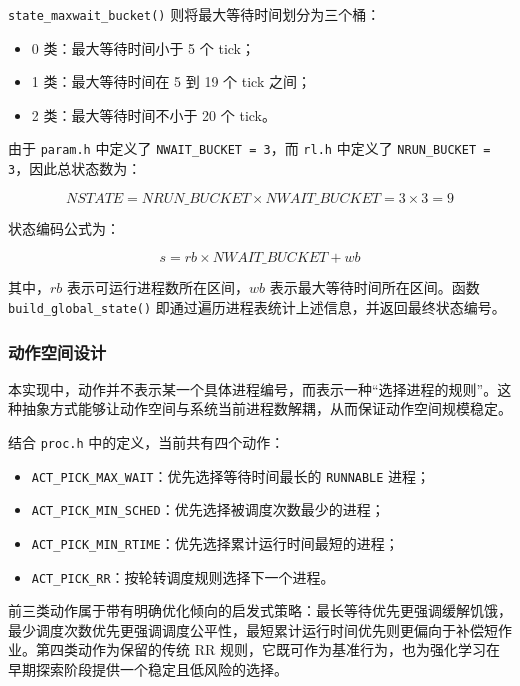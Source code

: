 \texttt{state\_maxwait\_bucket()} 则将最大等待时间划分为三个桶：

\begin{itemize}
\item 0 类：最大等待时间小于 5 个 tick；
\item 1 类：最大等待时间在 5 到 19 个 tick 之间；
\item 2 类：最大等待时间不小于 20 个 tick。
\end{itemize}

由于 \texttt{param.h} 中定义了 \texttt{NWAIT\_BUCKET = 3}，而 \texttt{rl.h} 中定义了 \texttt{NRUN\_BUCKET = 3}，因此总状态数为：

\begin{equation}
NSTATE = NRUN\_BUCKET \times NWAIT\_BUCKET = 3 \times 3 = 9
\end{equation}

状态编码公式为：

\begin{equation}
s = rb \times NWAIT\_BUCKET + wb
\end{equation}

其中，$rb$ 表示可运行进程数所在区间，$wb$ 表示最大等待时间所在区间。函数 \texttt{build\_global\_state()} 即通过遍历进程表统计上述信息，并返回最终状态编号。

\subsubsection{动作空间设计}

本实现中，动作并不表示某一个具体进程编号，而表示一种“选择进程的规则”。这种抽象方式能够让动作空间与系统当前进程数解耦，从而保证动作空间规模稳定。

结合 \texttt{proc.h} 中的定义，当前共有四个动作：

\begin{itemize}
\item \texttt{ACT\_PICK\_MAX\_WAIT}：优先选择等待时间最长的 \texttt{RUNNABLE} 进程；
\item \texttt{ACT\_PICK\_MIN\_SCHED}：优先选择被调度次数最少的进程；
\item \texttt{ACT\_PICK\_MIN\_RTIME}：优先选择累计运行时间最短的进程；
\item \texttt{ACT\_PICK\_RR}：按轮转调度规则选择下一个进程。
\end{itemize}

前三类动作属于带有明确优化倾向的启发式策略：最长等待优先更强调缓解饥饿，最少调度次数优先更强调调度公平性，最短累计运行时间优先则更偏向于补偿短作业。第四类动作为保留的传统 RR 规则，它既可作为基准行为，也为强化学习在早期探索阶段提供一个稳定且低风险的选择。

